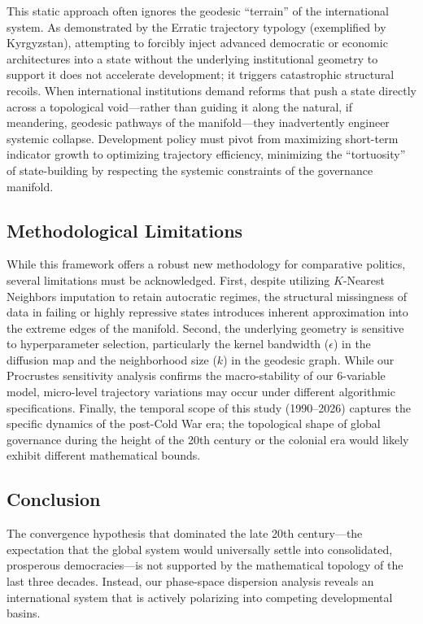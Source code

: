 \documentclass[12pt]{article}
\begin{document}
This static approach often ignores the geodesic ``terrain'' of the international system. As demonstrated by the Erratic trajectory typology (exemplified by Kyrgyzstan), attempting to forcibly inject advanced democratic or economic architectures into a state without the underlying institutional geometry to support it does not accelerate development; it triggers catastrophic structural recoils. When international institutions demand reforms that push a state directly across a topological void—rather than guiding it along the natural, if meandering, geodesic pathways of the manifold—they inadvertently engineer systemic collapse. Development policy must pivot from maximizing short-term indicator growth to optimizing trajectory efficiency, minimizing the ``tortuosity'' of state-building by respecting the systemic constraints of the governance manifold.

\subsection{Methodological Limitations}
While this framework offers a robust new methodology for comparative politics, several limitations must be acknowledged. First, despite utilizing $K$-Nearest Neighbors imputation to retain autocratic regimes, the structural missingness of data in failing or highly repressive states introduces inherent approximation into the extreme edges of the manifold. Second, the underlying geometry is sensitive to hyperparameter selection, particularly the kernel bandwidth ($\epsilon$) in the diffusion map and the neighborhood size ($k$) in the geodesic graph. While our Procrustes sensitivity analysis confirms the macro-stability of our 6-variable model, micro-level trajectory variations may occur under different algorithmic specifications. Finally, the temporal scope of this study (1990--2026) captures the specific dynamics of the post-Cold War era; the topological shape of global governance during the height of the 20th century or the colonial era would likely exhibit different mathematical bounds.

\subsection{Conclusion}
The convergence hypothesis that dominated the late 20th century—the expectation that the global system would universally settle into consolidated, prosperous democracies—is not supported by the mathematical topology of the last three decades. Instead, our phase-space dispersion analysis reveals an international system that is actively polarizing into competing developmental basins.
\end{document}
